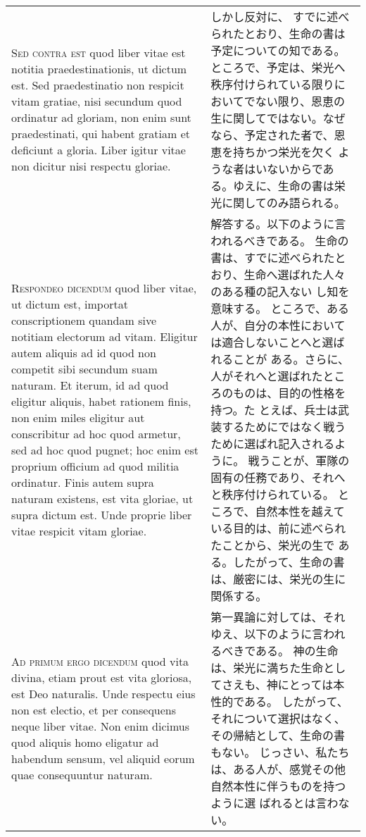 \documentclass[10pt]{jsarticle} %
\begin{document}
\begin{longtable}{p{21em}p{21em}}
\\


{\scshape Sed contra est} quod liber vitae est notitia
 praedestinationis, ut dictum est. Sed praedestinatio non respicit vitam
 gratiae, nisi secundum quod ordinatur ad gloriam, non enim sunt
 praedestinati, qui habent gratiam et deficiunt a gloria. Liber igitur
 vitae non dicitur nisi respectu gloriae.


&

しかし反対に、
すでに述べられたとおり、生命の書は予定についての知である。
ところで、予定は、栄光へ秩序付けられている限りにおいてでない限り、恩恵の
 生に関してではない。なぜなら、予定された者で、恩恵を持ちかつ栄光を欠く
 ような者はいないからである。ゆえに、生命の書は栄光に関してのみ語られる。

\\


{\scshape Respondeo dicendum} quod liber vitae, ut dictum
 est, importat conscriptionem quandam sive notitiam electorum ad
 vitam. Eligitur autem aliquis ad id quod non competit sibi secundum
 suam naturam. Et iterum, id ad quod eligitur aliquis, habet rationem
 finis, non enim miles eligitur aut conscribitur ad hoc quod armetur,
 sed ad hoc quod pugnet; hoc enim est proprium officium ad quod militia
 ordinatur. Finis autem supra naturam existens, est vita gloriae, ut
 supra dictum est. Unde proprie liber vitae respicit vitam gloriae.

&

解答する。以下のように言われるべきである。
生命の書は、すでに述べられたとおり、生命へ選ばれた人々のある種の記入ない
 し知を意味する。
ところで、ある人が、自分の本性においては適合しないことへと選ばれることが
 ある。さらに、人がそれへと選ばれたところのものは、目的の性格を持つ。た
 とえば、兵士は武装するためにではなく戦うために選ばれ記入されるように。
 戦うことが、軍隊の固有の任務であり、それへと秩序付けられている。
ところで、自然本性を越えている目的は、前に述べられたことから、栄光の生で
 ある。したがって、生命の書は、厳密には、栄光の生に関係する。


\\


{\scshape Ad primum ergo dicendum} quod vita divina,
 etiam prout est vita gloriosa, est Deo naturalis. Unde respectu eius
 non est electio, et per consequens neque liber vitae. Non enim dicimus
 quod aliquis homo eligatur ad habendum sensum, vel aliquid eorum quae
 consequuntur naturam.


&

第一異論に対しては、それゆえ、以下のように言われるべきである。
神の生命は、栄光に満ちた生命としてさえも、神にとっては本性的である。
したがって、それについて選択はなく、その帰結として、生命の書もない。
じっさい、私たちは、ある人が、感覚その他自然本性に伴うものを持つように選
 ばれるとは言わない。




\end{longtable}
\end{document}
